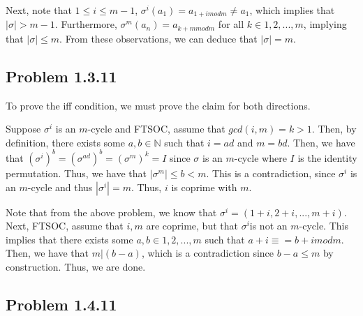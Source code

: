 \documentclass[11 pt]{article}
\theoremstyle{definition}
\theoremstyle{remark}
\begin{document}
Next, note that $1 \leq i \leq m-1$, $\sigma^i(a_1) = a_{1+i mod m} \neq a_1$, which implies that $|\sigma| > m-1$. Furthermore, $\sigma^m(a_n) = a_{k+m mod m}$ for all $k \in {1,2,...,m}$, implying that $|\sigma| \leq m$. From these observations, we can deduce that $|\sigma| = m$.

\subsection*{Problem 1.3.11}
To prove the iff condition, we must prove the claim for both directions.

Suppose $\sigma^i$ is an $m$-cycle and FTSOC, assume that $gcd(i,m) = k > 1$. Then, by definition, there exists some $a,b \in \mathbb{N}$ such that $i=ad$ and $m=bd$. Then, we have that $(\sigma^i)^b = (\sigma^{ad})^b = (\sigma^m)^k = I$ since $\sigma$ is an $m$-cycle where $I$ is the identity permutation. Thus, we have that $|\sigma^m| \leq b < m$. This is a contradiction, since $\sigma^i$ is an $m$-cycle and thus $|\sigma^i| = m$. Thus, $i$ is coprime with $m$.

Note that from the above problem, we know that $\sigma^i = (1+i, 2+i, ..., m+i)$. Next, FTSOC, assume that $i,m$ are coprime, but that $\sigma^i$is not an $m$-cycle. This implies that there exists some $a,b \in {1,2,...,m}$ such that $a+i \equiv = b+i mod m$. Then, we have that $m | (b-a)$, which is a contradiction since $b-a \leq m$ by construction. Thus, we are done.

\subsection*{Problem 1.4.11}
\end{document}
